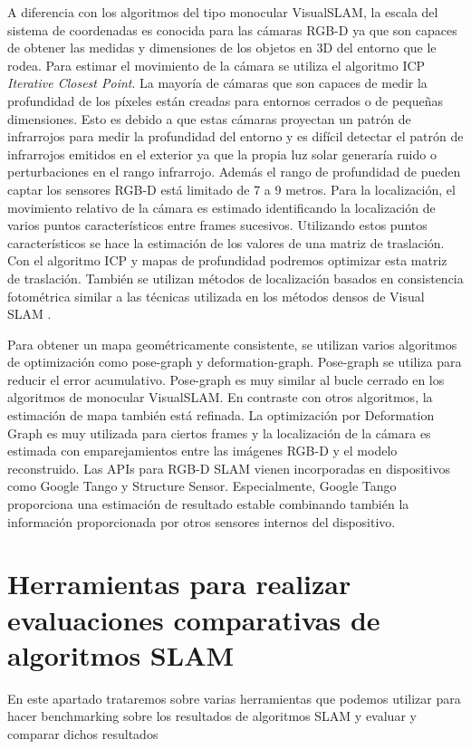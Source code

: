 A diferencia con los algoritmos del tipo monocular VisualSLAM, la escala del sistema de coordenadas es conocida para las cámaras RGB-D ya que son capaces de obtener las medidas y dimensiones de los objetos en 3D del entorno que le rodea.
Para estimar el movimiento de la cámara se utiliza el algoritmo ICP \textit{Iterative Closest Point}.
La mayoría de cámaras que son capaces de medir la profundidad de los píxeles están creadas para entornos cerrados o de pequeñas dimensiones. Esto es debido a que estas cámaras proyectan un patrón de infrarrojos para medir la profundidad del entorno y es difícil detectar el patrón de infrarrojos emitidos en el exterior ya que la propia luz solar generaría ruido o perturbaciones en el rango infrarrojo. Además el rango de profundidad de pueden captar los sensores RGB-D está limitado de 7 a 9 metros.
Para la localización, el movimiento relativo de la cámara es estimado identificando la localización de varios puntos característicos entre frames sucesivos. Utilizando estos puntos característicos se hace la estimación de los valores de una matriz de traslación. Con el algoritmo ICP y mapas de profundidad podremos optimizar esta matriz de traslación. También se utilizan métodos de localización basados en consistencia fotométrica similar a las técnicas utilizada en los métodos densos de Visual SLAM \cite{Takafumi17}.

Para obtener un mapa geométricamente consistente, se utilizan varios algoritmos de optimización como pose-graph y deformation-graph.
Pose-graph se utiliza para reducir el error acumulativo. Pose-graph es muy similar al bucle cerrado en los algoritmos de monocular VisualSLAM.
En contraste con otros algoritmos, la estimación de mapa también está refinada. La optimización por Deformation Graph es muy utilizada para ciertos frames y la localización de la cámara es estimada con emparejamientos entre las imágenes RGB-D y el modelo reconstruido.
Las APIs para RGB-D SLAM vienen incorporadas en dispositivos como Google Tango y Structure Sensor. Especialmente, Google Tango proporciona una estimación de resultado estable combinando también la información proporcionada por otros sensores internos del dispositivo.

\section{Herramientas para realizar evaluaciones comparativas de algoritmos SLAM}
En este apartado trataremos sobre varias herramientas que podemos utilizar para hacer benchmarking sobre los resultados de algoritmos SLAM y evaluar y comparar dichos resultados

